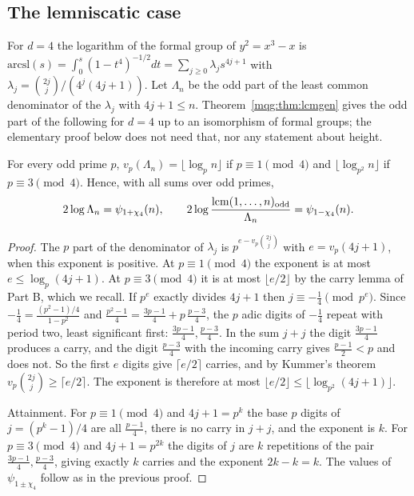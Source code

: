 \subsection{The lemniscatic case}\label{mqg:sec:lemn}

For $d=4$ the logarithm of the formal group of $y^2=x^3-x$ is $\mathrm{arcsl}(s)=\int_0^s(1-t^4)^{-1/2}dt=\sum_{j\ge0}\lambda_js^{4j+1}$ with $\lambda_j=\binom{2j}{j}/(4^j(4j+1))$. Let $\Lambda_n$ be the odd part of the least common denominator of the $\lambda_j$ with $4j+1\le n$. Theorem~\ref{mqg:thm:lcmgen} gives the odd part of the following for $d=4$ up to an isomorphism of formal groups; the elementary proof below does not need that, nor any statement about height.

\begin{theorem}\label{mqg:thm:lemn}
For every odd prime $p$, $v_p(\Lambda_n)=\lfloor\log_pn\rfloor$ if $p\equiv1\pmod4$ and $\lfloor\log_{p^2}n\rfloor$ if $p\equiv3\pmod4$. Hence, with all sums over odd primes,
\[
2\log\Lambda_n=\psi_{1+\chi_4}(n),\qquad2\log\frac{\mathrm{lcm}(1,\dots,n)_{\rm odd}}{\Lambda_n}=\psi_{1-\chi_4}(n).
\]
\end{theorem}

\begin{proof}
The $p$ part of the denominator of $\lambda_j$ is $p^{e-v_p\binom{2j}{j}}$ with $e=v_p(4j+1)$, when this exponent is positive. At $p\equiv1\pmod4$ the exponent is at most $e\le\log_p(4j+1)$. At $p\equiv3\pmod4$ it is at most $\lfloor e/2\rfloor$ by the carry lemma of Part B, which we recall. If $p^e$ exactly divides $4j+1$ then $j\equiv-\frac14\pmod{p^e}$. Since $-\frac14=\frac{(p^2-1)/4}{1-p^2}$ and $\frac{p^2-1}{4}=\frac{3p-1}{4}+p\,\frac{p-3}{4}$, the $p$ adic digits of $-\frac14$ repeat with period two, least significant first: $\frac{3p-1}{4},\frac{p-3}{4}$. In the sum $j+j$ the digit $\frac{3p-1}{4}$ produces a carry, and the digit $\frac{p-3}{4}$ with the incoming carry gives $\frac{p-1}{2}<p$ and does not. So the first $e$ digits give $\lceil e/2\rceil$ carries, and by Kummer's theorem $v_p\binom{2j}{j}\ge\lceil e/2\rceil$. The exponent is therefore at most $\lfloor e/2\rfloor\le\lfloor\log_{p^2}(4j+1)\rfloor$.

Attainment. For $p\equiv1\pmod4$ and $4j+1=p^k$ the base $p$ digits of $j=(p^k-1)/4$ are all $\frac{p-1}{4}$, there is no carry in $j+j$, and the exponent is $k$. For $p\equiv3\pmod4$ and $4j+1=p^{2k}$ the digits of $j$ are $k$ repetitions of the pair $\frac{3p-1}{4},\frac{p-3}{4}$, giving exactly $k$ carries and the exponent $2k-k=k$. The values of $\psi_{1\pm\chi_4}$ follow as in the previous proof.
\end{proof}

